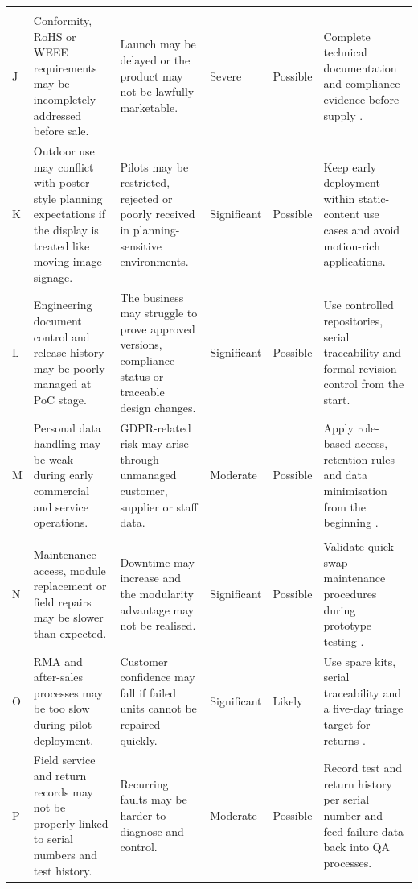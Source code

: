 \documentclass[11pt,a4paper]{article}
\begin{document}
\begin{longtable}{L{0.8cm}L{3.5cm}L{3.2cm}L{1.3cm}L{1.4cm}L{3.8cm}}
\addlinespace
{} \\
J & Conformity, RoHS or WEEE requirements may be incompletely addressed before sale. & Launch may be delayed or the product may not be lawfully marketable. & Severe & Possible & Complete technical documentation and compliance evidence before supply \cite{ref19,ref20,ref22}. \\
K & Outdoor use may conflict with poster-style planning expectations if the display is treated like moving-image signage. & Pilots may be restricted, rejected or poorly received in planning-sensitive environments. & Significant & Possible & Keep early deployment within static-content use cases and avoid motion-rich applications. \\
L & Engineering document control and release history may be poorly managed at PoC stage. & The business may struggle to prove approved versions, compliance status or traceable design changes. & Significant & Possible & Use controlled repositories, serial traceability and formal revision control from the start. \\
M & Personal data handling may be weak during early commercial and service operations. & GDPR-related risk may arise through unmanaged customer, supplier or staff data. & Moderate & Possible & Apply role-based access, retention rules and data minimisation from the beginning \cite{ref29}. \\

\addlinespace
{} \\
N & Maintenance access, module replacement or field repairs may be slower than expected. & Downtime may increase and the modularity advantage may not be realised. & Significant & Possible & Validate quick-swap maintenance procedures during prototype testing \cite{ref2}. \\
O & RMA and after-sales processes may be too slow during pilot deployment. & Customer confidence may fall if failed units cannot be repaired quickly. & Significant & Likely & Use spare kits, serial traceability and a five-day triage target for returns \cite{ref22}. \\
P & Field service and return records may not be properly linked to serial numbers and test history. & Recurring faults may be harder to diagnose and control. & Moderate & Possible & Record test and return history per serial number and feed failure data back into QA processes. \\


\end{longtable}
\end{document}
